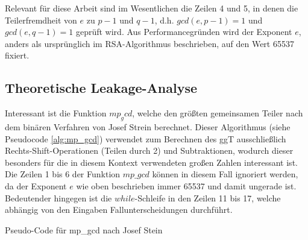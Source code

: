 
%

Relevant für diese Arbeit sind im Wesentlichen die Zeilen 4 und 5, in denen die Teilerfremdheit von $e$ zu $p-1$ und $q-1$, d.h. $gcd(e,p-1) = 1$ und $gcd(e,q-1) = 1$ geprüft wird.
Aus Performancegründen wird der Exponent $e$, anders als ursprünglich im RSA-Algorithmus beschrieben, auf den Wert 65537 fixiert.

\subsection{Theoretische Leakage-Analyse}

Interessant ist die Funktion $mp_gcd$, welche den größten gemeinsamen Teiler nach dem binären Verfahren von Josef Strein \cite{SteinBinaryGCD} berechnet. 
Dieser Algorithmus (siehe Pseudocode \ref{alg:mp_gcd}) verwendet zum Berechnen des ggT ausschließlich Rechts-Shift-Operationen (Teilen durch 2) und Subtraktionen, wodurch dieser besonders für die in diesem Kontext verwendeten großen Zahlen interessant ist.
Die Zeilen 1 bis 6 der Funktion $mp\_gcd$ können in diesem Fall ignoriert werden, da der Exponent $e$ wie oben beschrieben immer 65537 und damit ungerade ist. 
Bedeutender hingegen ist die $while$-Schleife in den Zeilen 11 bis 17, welche abhängig von den Eingaben Fallunterscheidungen durchführt. 

\begin{algorithm}[h]
\DontPrintSemicolon
\caption{Pseudo-Code für mp_gcd nach Josef Stein}
\label{alg:mp_gcd}

\end{algorithm}


